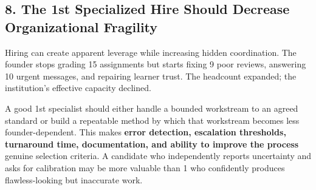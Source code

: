 \subsection*{8. The 1st Specialized Hire Should Decrease Organizational Fragility}

Hiring can create apparent leverage while increasing hidden coordination. The founder stops grading 15 assignments but starts fixing 9 poor reviews, answering 10 urgent messages, and repairing learner trust. The headcount expanded; the institution's effective capacity declined.

A good 1st specialist should either handle a bounded workstream to an agreed standard or build a repeatable method by which that workstream becomes less founder-dependent. This makes \textbf{error detection, escalation thresholds, turnaround time, documentation, and ability to improve the process} genuine selection criteria. A candidate who independently reports uncertainty and asks for calibration may be more valuable than 1 who confidently produces flawless-looking but inaccurate work.
